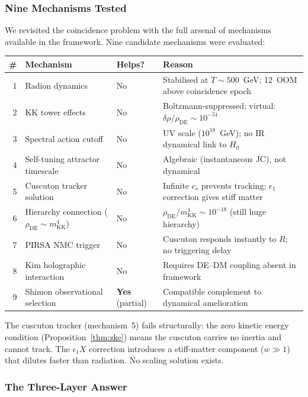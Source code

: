 \subsubsection{Nine Mechanisms Tested}

We revisited the coincidence problem with the full arsenal of mechanisms available in the framework. Nine candidate mechanisms were evaluated:

\begin{center}
\small
\begin{tabular}{r l l l}
\hline
\# & Mechanism & Helps? & Reason \\
\hline
1 & Radion dynamics               & No & Stabilised at $T \sim 500$~GeV; 12~OOM above coincidence epoch \\
2 & KK tower effects              & No & Boltzmann-suppressed; virtual: $\delta\rho/\rho_{\mathrm{DE}} \sim 10^{-51}$ \\
3 & Spectral action cutoff          & No & UV scale ($10^{18}$~GeV); no IR dynamical link to $H_0$ \\
4 & Self-tuning attractor timescale & No & Algebraic (instantaneous JC), not dynamical \\
5 & Cuscuton tracker solution       & No & Infinite $c_s$ prevents tracking; $\epsilon_1$ correction gives stiff matter \\
6 & Hierarchy connection ($\rho_{\mathrm{DE}} \sim m_{\mathrm{KK}}^4$) & No & $\rho_{\mathrm{DE}}/m_{\mathrm{KK}}^4 \sim 10^{-18}$ (still huge hierarchy) \\
7 & PIRSA NMC trigger               & No & Cuscuton responds instantly to $R$; no triggering delay \\
8 & Kim holographic interaction      & No & Requires DE--DM coupling absent in framework \\
9 & Shimon observational selection   & \textbf{Yes} (partial) & Compatible complement to dynamical amelioration \\
\hline
\end{tabular}
\end{center}

\noindent
The cuscuton tracker (mechanism~5) fails structurally: the zero kinetic energy condition (Proposition~\ref{thm:zke}) means the cuscuton carries no inertia and cannot track. The $\epsilon_1 X$ correction introduces a stiff-matter component ($w \gg 1$) that dilutes faster than radiation. No scaling solution exists.

\subsubsection{The Three-Layer Answer}

